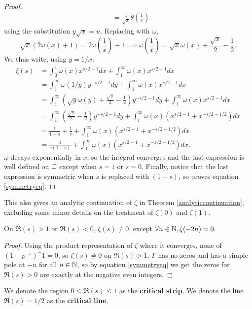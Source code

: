 \begin{proof}
\begin{align*}
		&= \frac{1}{\sqrt{x}} \theta \left(\frac{1}{x}\right)
	\end{align*}
	using the substitution $y\sqrt{x}=u$. Replacing with $\omega$, \[
	\sqrt{x}(2\omega(x)+1) = 2\omega\left(\frac{1}{x}\right)+1
	\implies \omega\left(\frac{1}{x}\right)=\sqrt{x}\omega(x) +\frac{\sqrt{x}}{2} - \frac{1}{2}.
	\]
	We thus write, using $y=1/x$, \begin{align*}
		\xi(s) &= \int_{0}^{1}\omega(x) x^{s/2-1} dx +
		\int_{1}^{\infty}\omega(x)  x^{s/2-1} dx\\
		&=\int_{1}^{\infty}\omega(1/y) y^{-s/2-1} dy +
		\int_{1}^{\infty}\omega(x)  x^{s/2-1} dx\\
		&=\int_{1}^{\infty}\left(
		\sqrt{y}\omega(y) +\frac{\sqrt{y}}{2} - \frac{1}{2}
		\right) y^{-s/2-1} dy +
		\int_{1}^{\infty}\omega(x)  x^{s/2-1} dx\\
		&= \int_{1}^{\infty}\left(
			\frac{\sqrt{y}}{2} - \frac{1}{2}
			\right) y^{-s/2-1} dy+ \int_{1}^{\infty}\omega(x)  \left(x^{s/2-1} + x^{-s/2-1/2}\right)dx\\
		&= \frac{1}{1-s} + \frac{1}{s}+  \int_{1}^{\infty}\omega(x)  \left(x^{s/2-1} + x^{-s/2-1/2}\right)dx\\
		&= \frac{1}{s(1-s)}+ \int_{1}^{\infty}\omega(x)  \left(x^{s/2-1} + x^{-s/2-1/2}\right)dx.
	\end{align*}
	$\omega$ decays exponentially in $x$, so the integral converges and the last expression is well defined on $\mathbb{C}$ except when $s=1$ or $s=0$.
	Finally, notice that the last expression is symmetric when $s$ is replaced with $(1-s)$, so proves equation \ref{symmetryeq}.
\end{proof}
\begin{remark}
	This also gives an analytic continuation of $\zeta$ in Theorem \ref{analyticcontinuation}, excluding some minor details
	on the treatment of $\zeta(0)$ and $\zeta(1)$.
\end{remark}
\begin{corollary}
	On $\Re(s)>1$ or $\Re(s)<0$, $\zeta(s)\neq 0$, except $\forall n\in\mathbb{N}, \zeta(-2n)=0.$
\end{corollary}
\begin{proof}
	Using the product representation of $\zeta$ where it converges, none of $(1-p^{-s})^-1 =0$, so $\zeta(s)\neq 0$ on $\Re(s)>1$.
	$\Gamma$ has no zeros and has a simple pole at $-n$ for all $n\in\mathbb{N}$, so by equation \ref{symmetryeq} we get the zeros for $\Re(s)>0$ are exactly at the negative even integers.
\end{proof}
\begin{definition}
	We denote the region $0\leq \Re(s) \leq 1$ as the \textbf{critical strip}. We denote the line $\Re(s) = 1/2$ as the \textbf{critical line}.
\end{definition}

